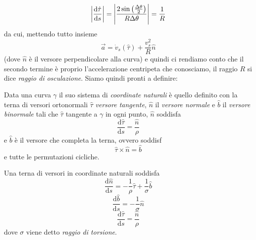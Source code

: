 \documentclass[11pt]{scrartcl}
\newcommand{\dif}{\text{d}}
\begin{document}
	$$\abs{\frac{\dif \hat{\tau}}{\dif s}}=\abs{\frac{2\sin\left(\frac{\Delta \theta}{2}\right)}{R \Delta \theta}}=\frac{1}{R}$$
	da cui, mettendo tutto insieme 
	$$\vec{a}=\dot{v}_s(\hat{\tau})+\frac{v_s^2}{R}\hat{n}$$
	(dove $\hat{n}$ è il versore perpendicolare alla curva) e quindi ci rendiamo conto che il secondo termine è proprio l'accelerazione centripeta che conosciamo, il raggio $R$ si dice \textit{raggio di osculazione}. Siamo quindi pronti a definire:
	\begin{definition}
		Data una curva $\gamma$ il suo sistema di \textit{coordinate naturali} è quello definito con la terna di versori ortonormali $\hat{\tau}$ \textit{versore tangente}, $\hat{n}$ il \textit{versore normale} e $\hat{b}$ il \textit{versore binormale} tali che $\hat{\tau}$ tangente a $\gamma$ in ogni punto, $\hat{n}$ soddisfa
		$$\frac{\dif \hat{\tau}}{\dif s}=\frac{\hat{n}}{\rho}$$
		e $\hat{b}$ è il versore che completa la terna, ovvero soddisf
		$$\hat{\tau}\times \hat{n}=\hat{b}$$
		e tutte le permutazioni cicliche.
	\end{definition}
	\begin{lemma}
		Una terna di versori in coordinate naturali soddisfa
		$$\frac{\dif \hat{n}}{\dif s}=-\frac{1}{\rho}\hat{\tau}+\frac{1}{\sigma}\hat{b}$$
		$$\frac{\dif \hat{b}}{\dif s}=-\frac{1}{\sigma}\hat{n}$$
		$$\frac{\dif \hat{\tau}}{\dif s}=\frac{\hat{n}}{\rho}$$
		dove $\sigma$ viene detto \textit{raggio di torsione}.
	\end{lemma}
\end{document}
